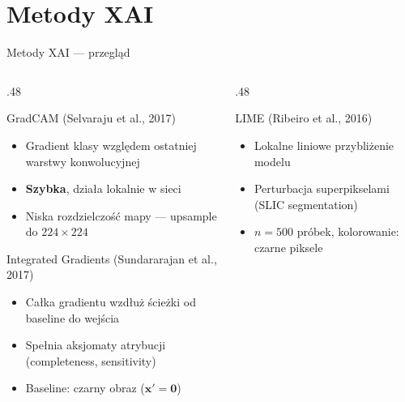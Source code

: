 \documentclass[aspectratio=169, 12pt]{beamer}
\begin{document}
\section{Metody XAI}

\begin{frame}{Metody XAI — przegląd}
  \begin{columns}[T]
    \begin{column}{.48\textwidth}
      \begin{block}{GradCAM \small(Selvaraju et al., 2017)}
        \begin{itemize}
          \item Gradient klasy względem ostatniej warstwy konwolucyjnej
          \item \textbf{Szybka}, działa lokalnie w sieci
          \item Niska rozdzielczość mapy — upsample do $224\times224$
        \end{itemize}
      \end{block}
      \vspace{6pt}
      \begin{block}{Integrated Gradients \small(Sundararajan et al., 2017)}
        \begin{itemize}
          \item Całka gradientu wzdłuż ścieżki od baseline do wejścia
          \item Spełnia aksjomaty atrybucji (completeness, sensitivity)
          \item Baseline: czarny obraz ($\mathbf{x}' = \mathbf{0}$)
        \end{itemize}
      \end{block}
    \end{column}
    \begin{column}{.48\textwidth}
      \begin{block}{LIME \small(Ribeiro et al., 2016)}
        \begin{itemize}
          \item Lokalne liniowe przybliżenie modelu
          \item Perturbacja superpikselami (SLIC segmentation)
          \item $n=500$ próbek, kolorowanie: czarne piksele
        \end{itemize}
      \end{block}
      \vspace{6pt}

\end{column}
\end{columns}
\end{frame}
\end{document}
